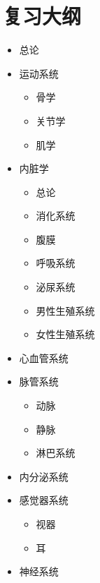 {}
\section{复习大纲}%
\label{sec:复习大纲}
\begin{itemize}
    \item 总论
    \item 运动系统
        \begin{itemize}
            \item 骨学
            \item 关节学
            \item 肌学
        \end{itemize}
    \item 内脏学
        \begin{itemize}
            \item 总论
            \item 消化系统
            \item 腹膜
            \item 呼吸系统
            \item 泌尿系统
            \item 男性生殖系统
            \item 女性生殖系统
        \end{itemize}
    \item 心血管系统
    \item 脉管系统
        \begin{itemize}
            \item 动脉
            \item 静脉
            \item 淋巴系统
        \end{itemize}
    \item 内分泌系统
    \item 感觉器系统
        \begin{itemize}
            \item 视器
            \item 耳
        \end{itemize}
    \item 神经系统
\end{itemize}
